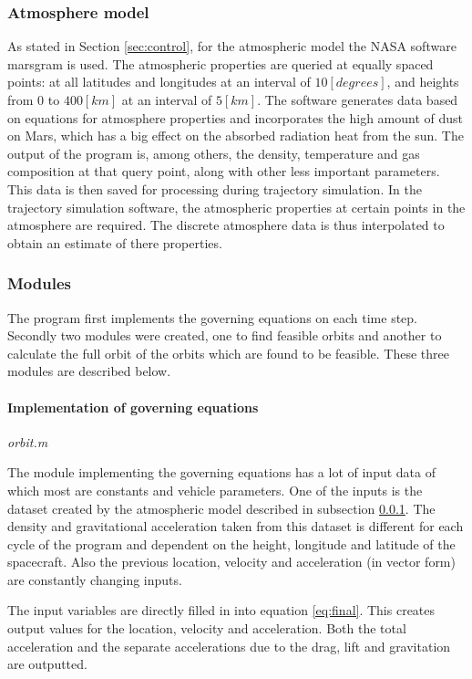 \subsubsection{Atmosphere model}\label{subsec:atmos}
As stated in Section \ref{sec:control}, for the atmospheric model the NASA software \gls{marsgram} is used. The atmospheric properties are queried at equally spaced points: at all latitudes and longitudes at an interval of $10 [degrees]$, and heights from $0$ to $400 [km]$ at an interval of $5 [km]$. The software generates data based on equations for atmosphere properties and incorporates the high amount of dust on Mars, which has a big effect on the absorbed radiation heat from the sun. The output of the program is, among others, the density, temperature and gas composition at that query point, along with other less important parameters. \cite{Justus2001}
This data is then saved for processing during trajectory simulation. In the trajectory simulation software, the atmospheric properties at certain points in the atmosphere are required. The discrete atmosphere data is thus interpolated to obtain an estimate of there properties. 

\subsubsection{Modules} \label{subsec:modules}

The program first implements the governing equations on each time step. Secondly two modules were created, one to find feasible orbits and another to calculate the full orbit of the orbits which are found to be feasible. These three modules are described below.

\paragraph{Implementation of governing equations}\textit{orbit.m}

The module implementing the governing equations has a lot of input data of which most are constants and vehicle parameters. One of the inputs is the dataset created by the atmospheric model described in subsection \ref{subsec:atmos}. The density and gravitational acceleration taken from this dataset is different for each cycle of the program and dependent on the height, longitude and latitude of the spacecraft. Also the previous location, velocity and acceleration (in vector form) are constantly changing inputs.

The input variables are directly filled in into equation \ref{eq:final}. This creates output values for the location, velocity and acceleration. Both the total acceleration and the separate accelerations due to the drag, lift and gravitation are outputted.
